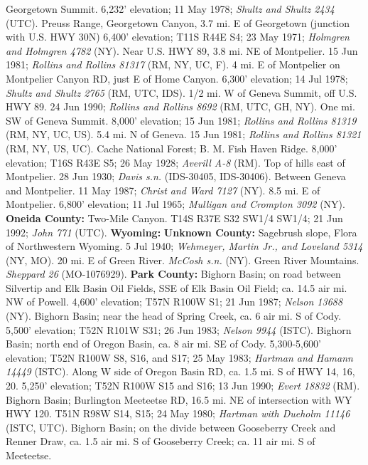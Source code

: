 Georgetown Summit. 6,232' elevation; 11 May 1978;
\textit{Shultz and Shultz 2434} (UTC).
Preuss Range, Georgetown Canyon, 3.7 mi. E of Georgetown
(junction with U.S. HWY 30N) 6,400' elevation; T11S R44E S4; 23 May 1971;
\textit{Holmgren and Holmgren 4782} (NY).
Near U.S. HWY 89, 3.8 mi. NE of Montpelier. 15 Jun 1981;
\textit{Rollins and Rollins 81317} (RM, NY, UC, F).
4 mi. E of Montpelier on Montpelier Canyon RD, just E of Home Canyon.
6,300' elevation; 14 Jul 1978; \textit{Shultz and Shultz 2765} (RM, UTC, IDS).
1/2 mi. W of Geneva Summit, off U.S. HWY 89. 24 Jun 1990;
\textit{Rollins and Rollins 8692} (RM, UTC, GH, NY).
One mi. SW of Geneva Summit. 8,000' elevation; 15 Jun 1981;
\textit{Rollins and Rollins 81319} (RM, NY, UC, US).
5.4 mi. N of Geneva. 15 Jun 1981;
\textit{Rollins and Rollins 81321} (RM, NY, US, UC).
Cache National Forest; B. M. Fish Haven Ridge. 8,000' elevation; T16S R43E S5;
26 May 1928; \textit{Averill A-8} (RM).
Top of hills east of Montpelier. 28 Jun 1930;
\textit{Davis s.n.} (IDS-30405, IDS-30406).
Between Geneva and Montpelier. 11 May 1987; \textit{Christ and Ward 7127} (NY).
8.5 mi. E of Montpelier. 6,800' elevation; 11 Jul 1965;
\textit{Mulligan and Crompton 3092} (NY).
  \textbf{Oneida County:}
Two-Mile Canyon. T14S R37E S32 SW1/4 SW1/4; 21 Jun 1992;
\textit{John 771} (UTC).
  \textbf{Wyoming:}
  \textbf{Unknown County:}
Sagebrush slope, Flora of Northwestern Wyoming. 5 Jul 1940;
\textit{Wehmeyer, Martin Jr., and Loveland 5314} (NY, MO).
20 mi. E of Green River. \textit{McCosh s.n.} (NY).
Green River Mountains. \textit{Sheppard 26} (MO-1076929).
  \textbf{Park County:}
Bighorn Basin; on road between Silvertip and Elk Basin Oil Fields, SSE of Elk
Basin Oil Field; ca. 14.5 air mi. NW of Powell. 4,600' elevation;
T57N R100W S1; 21 Jun 1987; \textit{Nelson	13688} (NY).
Bighorn Basin; near the head of Spring Creek, ca. 6 air mi. S of Cody.
5,500' elevation; T52N R101W S31; 26 Jun 1983; \textit{Nelson 9944} (ISTC).
Bighorn Basin; north end of Oregon Basin, ca. 8 air mi. SE of Cody.
5,300-5,600' elevation; T52N R100W S8, S16, and S17; 25 May 1983;
\textit{Hartman and Hamann 14449} (ISTC).
Along W side of Oregon Basin RD, ca. 1.5 mi. S of HWY 14, 16, 20.
5,250' elevation; T52N R100W S15 and S16;	13 Jun 1990; \textit{Evert 18832} (RM).
Bighorn Basin; Burlington Meeteetse RD, 16.5 mi. NE of intersection with
WY HWY 120. T51N R98W S14, S15; 24 May 1980;
\textit{Hartman with Dueholm 11146} (ISTC, UTC).
Bighorn Basin; on the divide between Gooseberry Creek and Renner Draw, ca.
1.5 air mi. S of Gooseberry Creek; ca. 11 air mi. S of Meeteetse.

